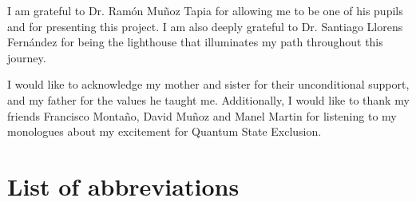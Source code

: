 \documentclass[12pt,letterpaper]{article}
\begin{document}
\begin{multicols}{2}
I am grateful to Dr. Ramón Muñoz Tapia for allowing me to be one of his pupils and for presenting this project. I am also deeply grateful to Dr. Santiago Llorens Fernández for being the lighthouse that illuminates my path throughout this journey.

I would like to acknowledge my mother and sister for their unconditional support, and my father for the values he taught me. Additionally, I would like to thank my friends Francisco Montaño, David Muñoz and Manel Martin for listening to my monologues about my excitement for Quantum State Exclusion.



 
\section*{List of abbreviations}
\renewcommand{\glsnamefont}[1]{\textbf{#1}}
\printnoidxglossary[type=main, title={\vspace{-1cm}}, nonumberlist, nogroupskip, style=super]


\end{multicols}
\end{document}
